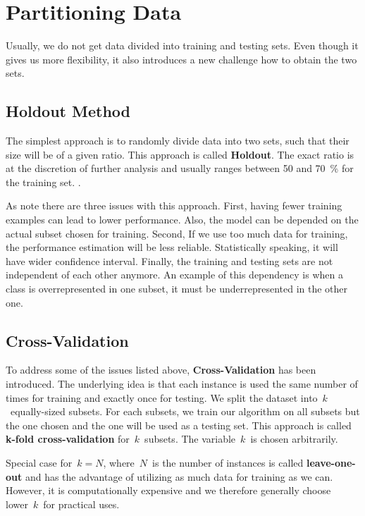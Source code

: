\section{Partitioning Data}

Usually, we do not get data divided into training and testing sets.
Even though it gives us more flexibility, it also introduces a new challenge how to obtain the two sets.

\subsection{Holdout Method}

The simplest approach is to randomly divide data into two sets, such that their size will be of a given ratio.
This approach is called {\bf Holdout}.
The exact ratio is at the discretion of further analysis and usually ranges between 50 and 70~\% for the training set. .

As \citet{TanBachKum08} note there are three issues with this approach.
First, having fewer training examples can lead to lower performance.
Also, the model can be depended on the actual subset chosen for training.
Second, If we use too much data for training, the performance estimation will be less reliable.
Statistically speaking, it will have wider confidence interval.
Finally, the training and testing sets are not independent of each other anymore.
An example of this dependency is when a class is overrepresented in one subset, it must be underrepresented in the other one.

\subsection{Cross-Validation}

To address some of the issues listed above, {\bf Cross-Validation} has been introduced.
The underlying idea is that each instance is used the same number of times for training and exactly once for testing.
We split the dataset into~$k$~equally-sized subsets.
For each subsets, we train our algorithm on all subsets but the one chosen and the one will be used as a testing set.
This approach is called {\bf k-fold cross-validation} for~$k$~subsets. The variable~$k$~is chosen arbitrarily.

Special case for~$k=N$, where~$N$~is the number of instances is called {\bf leave-one-out} and has the advantage of 
utilizing as much data for training as we can.
However, it is computationally expensive and we therefore generally choose lower~$k$~for practical uses.

